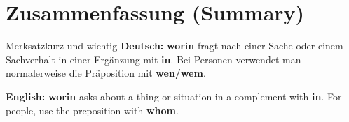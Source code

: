 \documentclass[a4paper,11pt]{article}
\newcommand{\GermanText}[1]{\textbf{Deutsch: }#1\par}
\newcommand{\EnglishText}[1]{{\small\color{SoftGray}\textbf{English: }#1\par}}
\begin{document}
\section{Zusammenfassung (Summary)}
\begin{grammarentry}{Merksatz}{kurz und wichtig}
\GermanText{\textbf{worin} fragt nach einer Sache oder einem Sachverhalt in einer Ergänzung mit \textbf{in}. Bei Personen verwendet man normalerweise die Präposition mit \textbf{wen/wem}.}
\EnglishText{\textbf{worin} asks about a thing or situation in a complement with \textbf{in}. For people, use the preposition with \textbf{whom}.}
\end{grammarentry}
\end{document}

